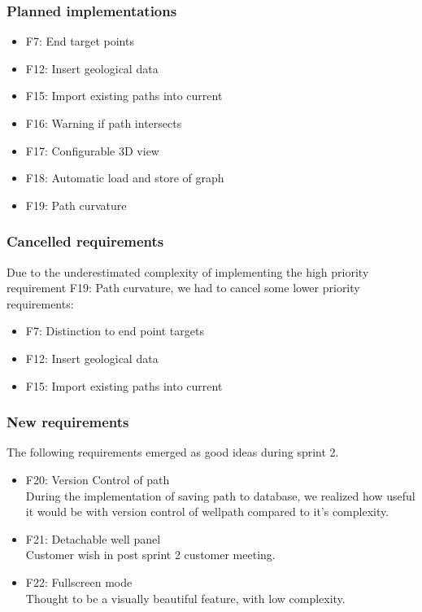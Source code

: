 \documentclass{report}
\begin{document}
\subsubsection{Planned implementations}

\begin{itemize}
    \item F7: End target points
    \item F12: Insert geological data
    \item F15: Import existing paths into current
    \item F16: Warning if path intersects
    \item F17: Configurable 3D view
    \item F18: Automatic load and store of graph
    \item F19: Path curvature
\end{itemize}

\subsubsection{Cancelled requirements}
Due to the underestimated complexity of implementing the high priority requirement F19: Path curvature, we had to cancel some lower priority requirements:
\begin{itemize}
    \item F7: Distinction to end point targets
    \item F12: Insert geological data
    \item F15: Import existing paths into current
\end{itemize}

\subsubsection{New requirements}
The following requirements emerged as good ideas during sprint 2.
\begin{itemize}
    \item F20: Version Control of path \\
    During the implementation of saving path to database, we realized how useful it would be with version control of wellpath compared to it's complexity.
    \item F21: Detachable well panel \\
    Customer wish in post sprint 2 customer meeting.
    \item F22: Fullscreen mode \\
    Thought to be a visually beautiful feature, with low complexity.
    
\end{itemize}
\end{document}
